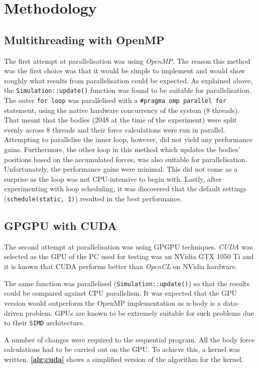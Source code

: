 \documentclass[12pt, a4paper]{article}
\begin{document}
    \section{Methodology}      
    \subsection{Multithreading with OpenMP}
    The first attempt at parallelisation was using \textit{OpenMP}. The reason this method was the first choice was that it would be simple to implement and would show roughly what results from parallelisation could be expected. As explained above, the \texttt{Simulation::update()} function was found to be suitable for parallelisation. The outer \texttt{for loop} was parallelised with a \lstinline{#pragma omp parallel for} statement, using the native hardware concurrency of the system (8 threads). That meant that the bodies (2048 at the time of the experiment) were split evenly across 8 threads and their force calculations were run in parallel. Attempting to parallelise the inner loop, however, did not yield any performance gains. Furthermore, the other loop in this method which updates the bodies' positions based on the accumulated forces, was also suitable for parallelisation. Unfortunately, the performance gains were minimal. This did not come as a surprise as the loop was not CPU-intensive to begin with. Lastly, after experimenting with loop scheduling, it was discovered that the default settings (\lstinline{schedule(static, 1)}) resulted in the best performance.

    \subsection{GPGPU with CUDA}
    The second attempt at parallelisation was using GPGPU techniques. \textit{CUDA} was selected as the GPU of the PC used for testing was an NVidia GTX 1050 Ti and it is known that CUDA performs better than \textit{OpenCL} on NVidia hardware. 

    The same function was parallelised (\texttt{Simulation::update()}) so that the results could be compared against CPU parallelism. It was expected that the GPU version would outperform the OpenMP implementation as n-body is a data-driven problem. GPUs are known to be extremely suitable for such problems due to their \texttt{SIMD} architecture.

    A number of changes were required to the sequential program. All the body force calculations had to be carried out on the GPU. To achieve this, a kernel was written. \textbf{\cref{alg:cuda}} shows a simplified version of the algorithm for the kernel.
\end{document}
